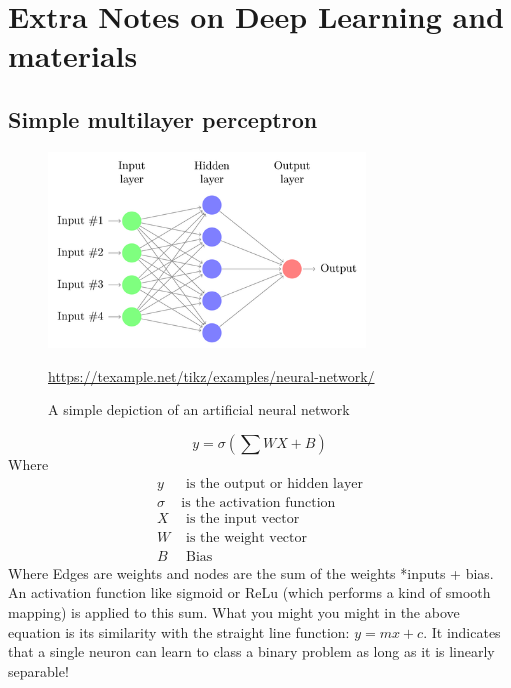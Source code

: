 

\chapter{Extra Notes on Deep Learning and materials} %

\label{AppendixA} %

\section{Simple multilayer perceptron}

\begin{figure}[h]
	\includegraphics[width=0.75\textwidth]{../Figures/neural-network.png}
	\caption[An ANN]{A simple depiction of an artificial neural network} \url{https://texample.net/tikz/examples/neural-network/}
\label{fig:appendix-mlp}
\end{figure}

\begin{equation*}
	y =  \sigma\left(\sum WX + B\right)
\end{equation*}
Where
\begin{align*}
	y &  \text{ is the output or hidden layer} \\
	\sigma &  \text{is the activation function} \\
	X &  \text{ is the input vector} \\
	W &  \text{ is the weight vector} \\
	B &  \text{ Bias}
\end{align*}
Where Edges are weights and nodes are the sum of the weights *inputs + bias. An activation function like sigmoid or ReLu (which performs a kind of smooth mapping) is applied to this sum. What you might you might in the above equation is its similarity with the straight line function: $y = mx + c$. It indicates that a single neuron can learn to class a binary problem as long as it is linearly separable!

